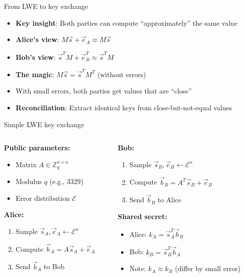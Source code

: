 \documentclass[aspectratio=169, lualatex, handout]{beamer}
\begin{document}
\begin{frame}{From LWE to key exchange}
	\begin{itemize}
		\item \textbf{Key insight}: Both parties can compute ``approximately'' the same value
		\item \textbf{Alice's view}: $M\vec{s} + \vec{e}_A \approx M\vec{s}$
		\item \textbf{Bob's view}: $\vec{s}^T M + \vec{e}_B^T \approx \vec{s}^T M$
		\item \textbf{The magic}: $M\vec{s} = \vec{s}^T M^T$ (without errors)
		\item With small errors, both parties get values that are ``close''
		\item \textbf{Reconciliation}: Extract identical keys from close-but-not-equal values
	\end{itemize}
\end{frame}

\begin{frame}{Simple LWE key exchange}
	\begin{columns}[c]
		\begin{column}{0.5\textwidth}
			\textbf{Public parameters:}
			\begin{itemize}
				\item Matrix $A \in \mathbb{Z}_q^{n \times n}$
				\item Modulus $q$ (e.g., 3329)
				\item Error distribution $\mathcal{E}$
			\end{itemize}

			\textbf{Alice:}
			\begin{enumerate}
				\item Sample $\vec{s}_A, \vec{e}_A \leftarrow \mathcal{E}^n$
				\item Compute $\vec{b}_A = A\vec{s}_A + \vec{e}_A$
				\item Send $\vec{b}_A$ to Bob
			\end{enumerate}
		\end{column}
		\begin{column}{0.5\textwidth}
			\textbf{Bob:}
			\begin{enumerate}
				\item Sample $\vec{s}_B, \vec{e}_B \leftarrow \mathcal{E}^n$
				\item Compute $\vec{b}_B = A^T\vec{s}_B + \vec{e}_B$
				\item Send $\vec{b}_B$ to Alice
			\end{enumerate}

			\textbf{Shared secret:}
			\begin{itemize}
				\item Alice: $k_A = \vec{s}_A^T \vec{b}_B$
				\item Bob: $k_B = \vec{s}_B^T \vec{b}_A$
				\item Note: $k_A \approx k_B$ (differ by small error)
			\end{itemize}
		\end{column}
	\end{columns}
\end{frame}
\end{document}
